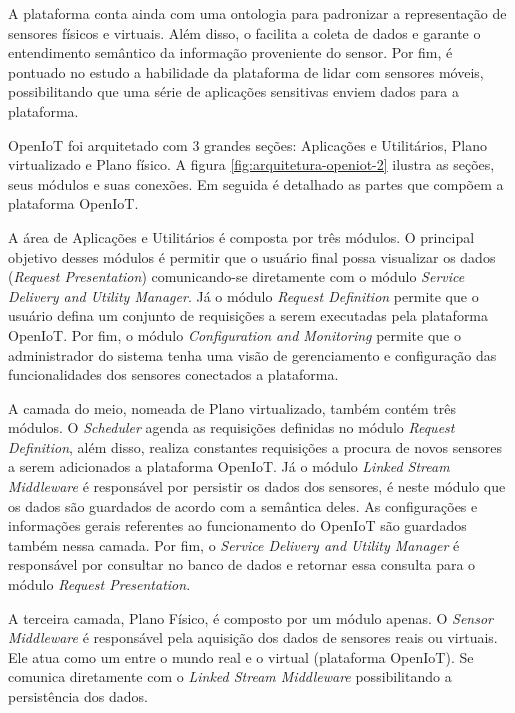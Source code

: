 A plataforma conta ainda com uma ontologia para padronizar a representação de
sensores físicos e virtuais. Além disso, o \middleware[] facilita a coleta de
dados e garante o entendimento semântico da informação proveniente do sensor.
Por fim, é pontuado no estudo a habilidade da plataforma de lidar com sensores
móveis, possibilitando que uma série de aplicações sensitivas enviem dados para
a plataforma.

OpenIoT foi arquitetado com 3 grandes seções: Aplicações e Utilitários, Plano
virtualizado e Plano físico. A figura \ref{fig:arquitetura-openiot-2} ilustra as
seções, seus módulos e suas conexões. Em seguida é detalhado as partes que
compõem a plataforma OpenIoT.

    
A área de Aplicações e Utilitários é composta por três módulos. O principal
objetivo desses módulos é permitir que o usuário final possa visualizar os
dados (\textit{Request Presentation}) comunicando-se diretamente com o módulo
\textit{Service Delivery and Utility Manager}.  Já o módulo \textit{Request
Definition} permite que o usuário defina um conjunto de requisições a serem
executadas pela plataforma OpenIoT. Por fim, o módulo \textit{Configuration and
Monitoring} permite que o administrador do sistema tenha uma visão de
gerenciamento e configuração das funcionalidades dos sensores conectados a
plataforma. 

A camada do meio, nomeada de Plano virtualizado, também contém três módulos. O
\textit{Scheduler} agenda as requisições definidas no módulo \textit{Request
Definition}, além disso, realiza constantes requisições a procura de novos
sensores a serem adicionados a plataforma OpenIoT. Já o módulo \textit{Linked
Stream Middleware} é responsável por persistir os dados dos sensores, é neste
módulo que os dados são guardados de acordo com a semântica deles.
As configurações e informações gerais referentes ao
funcionamento do OpenIoT são guardados também nessa camada. Por fim, o
\textit{Service Delivery and Utility Manager} é responsável por consultar no
banco de dados e retornar essa consulta para o módulo \textit{Request
Presentation}.

A terceira camada, Plano Físico, é composto por um módulo apenas. O \textit{Sensor
Middleware} é responsável pela aquisição dos dados de sensores reais ou
virtuais. Ele atua como um \gateway[] entre o mundo real e o virtual (plataforma
OpenIoT). Se comunica diretamente com o \textit{Linked Stream Middleware}
possibilitando a persistência dos dados.

